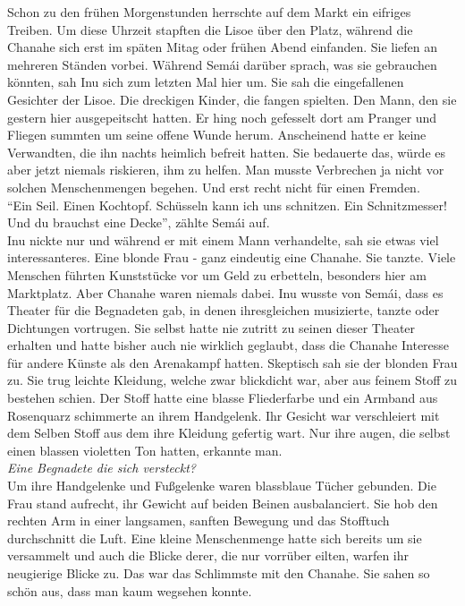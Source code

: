 Schon zu den frühen Morgenstunden herrschte auf dem Markt ein eifriges Treiben. Um diese Uhrzeit 
stapften die Lisoe über den Platz, während die Chanahe sich erst im späten Mitag oder frühen Abend 
einfanden. Sie liefen an mehreren Ständen vorbei. Während Semái darüber sprach, was sie gebrauchen 
könnten, sah Inu sich zum letzten Mal hier um. Sie sah die eingefallenen Gesichter der Lisoe. Die 
dreckigen Kinder, die fangen spielten. Den Mann, den sie gestern hier ausgepeitscht hatten. Er hing 
noch gefesselt dort am Pranger und Fliegen summten um seine offene Wunde herum. Anscheinend hatte 
er keine Verwandten, die ihn nachts heimlich befreit hatten. Sie bedauerte das, würde es aber jetzt 
niemals riskieren, ihm zu helfen. Man musste Verbrechen ja nicht vor solchen Menschenmengen 
begehen. Und erst recht nicht für einen Fremden. \\
``Ein Seil. Einen Kochtopf. Schüsseln kann ich uns schnitzen. Ein Schnitzmesser! Und du brauchst 
eine Decke'', zählte Semái auf.\\
Inu nickte nur und während er mit einem Mann verhandelte, sah sie etwas viel interessanteres. Eine 
blonde Frau - ganz eindeutig eine Chanahe. Sie tanzte. Viele Menschen führten Kunststücke vor um 
Geld zu erbetteln, besonders hier am Marktplatz. Aber Chanahe waren niemals dabei. Inu wusste von 
Semái, dass es Theater für die Begnadeten gab, in denen ihresgleichen musizierte, tanzte oder 
Dichtungen vortrugen. Sie selbst hatte nie zutritt zu seinen dieser Theater erhalten und hatte 
bisher auch nie wirklich geglaubt, dass die Chanahe Interesse für andere Künste als den Arenakampf 
hatten. Skeptisch sah sie der blonden Frau zu. Sie trug leichte Kleidung, welche zwar blickdicht 
war, aber aus feinem Stoff zu bestehen schien. Der Stoff hatte eine blasse Fliederfarbe und ein 
Armband aus Rosenquarz schimmerte an ihrem Handgelenk. Ihr Gesicht war verschleiert mit dem Selben 
Stoff aus dem ihre Kleidung gefertig wart. Nur ihre augen, die selbst einen blassen violetten Ton 
hatten, erkannte man. \\
\textit{Eine Begnadete die sich versteckt?}\\
Um ihre Handgelenke und Fußgelenke waren blassblaue Tücher gebunden. Die Frau stand aufrecht, ihr 
Gewicht auf beiden Beinen ausbalanciert. Sie hob den rechten Arm in einer langsamen, sanften 
Bewegung und das Stofftuch durchschnitt die Luft. Eine kleine Menschenmenge hatte sich bereits um 
sie versammelt und auch die Blicke derer, die nur vorrüber eilten, warfen ihr neugierige Blicke zu. 
Das war das Schlimmste mit den Chanahe. Sie sahen so schön aus, dass man kaum wegsehen konnte. 
